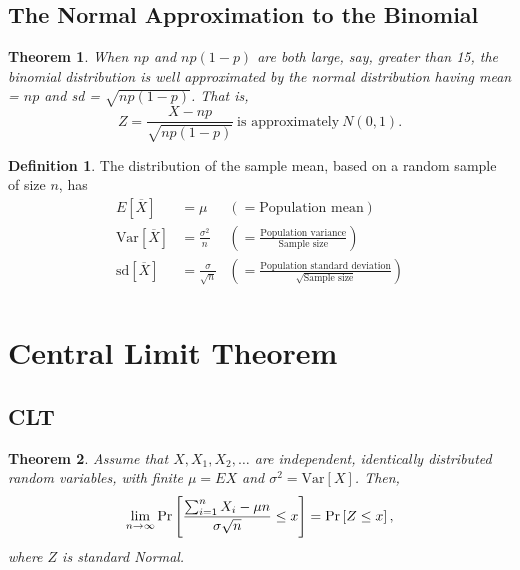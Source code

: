 \documentclass[12pt,openany]{book}
\newtheorem{theorem}{Theorem}[chapter]
\theoremstyle{definition}
\newtheorem{definition}{Definition}[chapter]
\newcommand{\Var}{\text{Var}}
\newcommand{\sd}{\text{sd}}
\begin{document}
	\subsection{The Normal Approximation to the Binomial}
	
	\begin{tcolorbox}[colback=white,colframe=thmcolor,arc=5pt,title={\color{white}\bf The Normal Approximation to the Binomial}]
		\begin{theorem}
			When $np$ and $np(1-p)$ are both large, say, greater than 15, the binomial distribution is well approximated by the normal distribution having mean = $np$ and sd = $\sqrt{np(1-p)}$. That is, \[
			Z=\frac{X-np}{\sqrt{np(1-p)}}\ \text{is approximately}\ N(0,1).
			\]
		\end{theorem}
	\end{tcolorbox}
	\vspace{5pt}
	\begin{tcolorbox}[colback=white,colframe=defcolor,arc=5pt,title={\color{white}\bf Mean and Standard Deviation of $\overline{X}$}]
		\begin{definition}
			The distribution of the sample mean, based on a random sample of size $n$, has \begin{align*}
				E[\overline{X}] &=\mu&(=\text{Population mean}) \\
				\Var[\overline{X}] &=\frac{\sigma^2}{n}&\left(=\frac{\text{Population variance}}{\text{Sample size}}\right) \\
				\sd[\overline{X}] &=\frac{\sigma}{\sqrt{n}}&\left(=\frac{\text{Population standard deviation}}{\sqrt{\text{Sample size}}}\right) \\
			\end{align*} 
		\end{definition}
	\end{tcolorbox}
	
	\newpage
	\section{Central Limit Theorem}
	\subsection{CLT}
	\begin{tcolorbox}[colback=white,colframe=thmcolor,arc=5pt,title={\color{white}\bf Central Limit Theorem}]
		\begin{theorem}
			Assume that $X,X_1,X_2,\dots$ are independent, identically distributed random variables, with finite $\mu=EX$ and $\sigma^2=\Var[X]$. Then, \[
			\lim\limits_{n\to\infty}\Pr\sbr{\frac{\sum_{i=1}^nX_i-\mu n}{\sigma\sqrt{n}}\leq x}=\Pr\sbr{Z\leq x},
			\] where $Z$ is standard Normal.
		\end{theorem}
	\end{tcolorbox}
	
\end{document}
